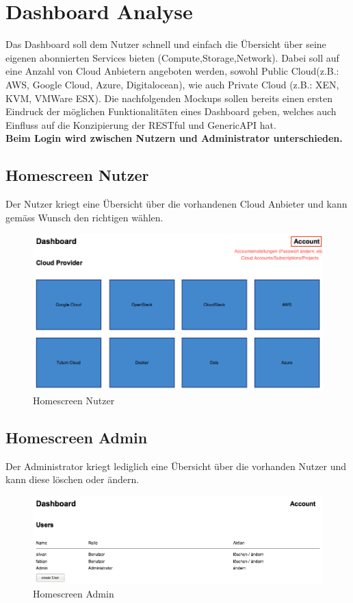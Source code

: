 \newpage
\section{Dashboard Analyse}
Das Dashboard soll dem Nutzer schnell und einfach die Übersicht über seine 
eigenen abonnierten Services bieten (Compute,Storage,Network).
Dabei soll auf eine Anzahl von Cloud Anbietern angeboten werden, sowohl Public 
Cloud(z.B.: AWS, Google Cloud, Azure, Digitalocean), wie auch Private Cloud (z.B.: XEN, KVM, VMWare ESX).
Die nachfolgenden Mockups sollen bereits einen ersten Eindruck der 
möglichen Funktionalitäten eines Dashboard geben, welches auch Einfluss auf die 
Konzipierung der RESTful und \gls{GenericAPI} hat.
\\
\textbf{Beim Login wird zwischen Nutzern und Administrator unterschieden.}

\subsection{Homescreen Nutzer}
Der Nutzer kriegt eine Übersicht über die vorhandenen Cloud Anbieter und kann 
gemäss Wunsch den richtigen wählen.
\begin{figure}[!htbp]
\includegraphics[width=\textwidth]{./03_Analyse/03_Dashboard/images/homescreen_user}
\caption{Homescreen Nutzer}
\end{figure}

\newpage

\subsection{Homescreen Admin}

Der Administrator kriegt lediglich eine Übersicht über die vorhanden Nutzer und 
kann diese löschen oder ändern.
\begin{figure}[!htbp]
  \includegraphics[width=\textwidth]{./03_Analyse/03_Dashboard/images/homescreen_admin}
  \caption{Homescreen Admin}
\end{figure}


